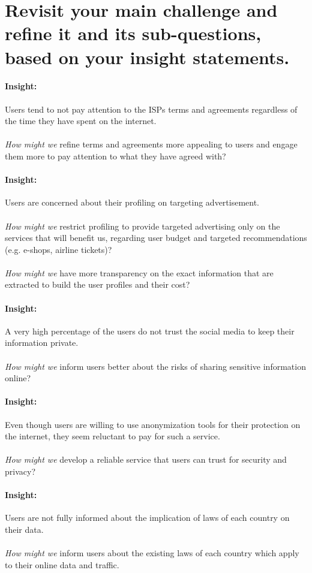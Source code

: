 \section{Revisit your main challenge and refine it and its sub-questions, based 
on your insight statements.}
\label{section_4}

\paragraph{Insight: } 
Users tend to not pay attention to the ISPs terms and agreements regardless of 
the time they have spent on the internet. \\
\\\emph{How might we } 
refine terms and agreements more appealing to users and engage them more to pay 
attention to what they have agreed with?

\paragraph{Insight: }
Users are concerned about their profiling on targeting advertisement. \\
\\\emph{How might we }
restrict profiling to provide targeted advertising only on the services that 
will benefit us, regarding user budget and targeted recommendations (e.g. 
e-shops, airline tickets)?\\
\\\emph{How might we }
have more transparency on the exact information that are extracted to build the 
user profiles and their cost?

\paragraph{Insight: }
A very high percentage of the users do not trust the social media to keep their 
information private.\\
\\\emph{How might we }
inform users better about the risks of sharing sensitive information online?

\paragraph{Insight: }
Even though users are willing to use anonymization tools for their protection on 
the internet, they seem reluctant to pay for such a service.\\
\\\emph{How might we }
develop a reliable service that users can trust for security and privacy?

\paragraph{Insight: }
Users are not fully informed about the implication of laws of each country on 
their data.\\
\\\emph{How might we }
inform users about the existing laws of each country which apply to their online 
data and traffic.


